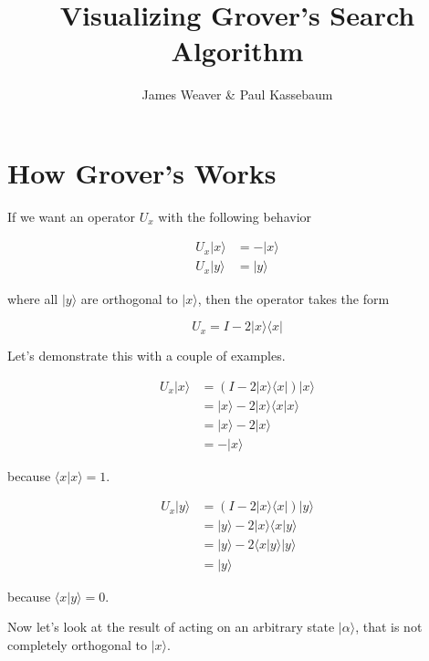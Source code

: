 \documentclass[12pt]{amsart}
\title{Visualizing Grover's Search Algorithm}
\author{James Weaver \& Paul Kassebaum}
\date{} %
\begin{document}
\maketitle

\section{How Grover's Works}

If we want an operator $U_x$ with the following behavior

\begin{equation}
	\begin{split}
		U_x |x\rangle & = - |x\rangle \\
		U_x |y\rangle & = |y\rangle 
	\end{split}
\end{equation}

where all $|y\rangle$ are orthogonal to $|x\rangle$, then the operator takes the form

\begin{equation}
	U_x = I - 2 |x\rangle\langle x|
\end{equation}

Let's demonstrate this with a couple of examples.

\begin{equation}
	\begin{split}
		U_x |x\rangle & = (I - 2 |x\rangle\langle x| ) |x\rangle \\
		& = |x\rangle - 2 |x\rangle\langle x | x\rangle \\
		& = |x\rangle - 2 |x\rangle \\
		& = - |x\rangle
	\end{split}
\end{equation}

because $\langle x | x\rangle = 1$.

\begin{equation}
	\begin{split}
		U_x |y\rangle & = (I - 2 |x\rangle\langle x| ) |y\rangle \\
		& = |y\rangle - 2 |x\rangle\langle x | y\rangle \\
		& = |y\rangle - 2 \langle x | y\rangle  |y\rangle \\
		& = |y\rangle
	\end{split}
\end{equation}

because $\langle x | y\rangle = 0$.

Now let's look at the result of acting on an arbitrary state $|\alpha\rangle$, that is not completely orthogonal to $|x\rangle$.
\end{document}
